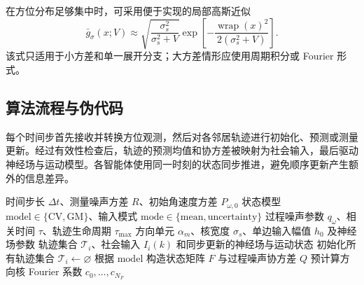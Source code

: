 \documentclass[UTF8,fontset=windows,11pt]{ctexart}
\begin{document}
在方位分布足够集中时，可采用便于实现的局部高斯近似
\begin{equation}
 \bar g_\sigma(x;V)\approx
 \sqrt{\frac{\sigma_s^2}{\sigma_s^2+V}}
 \exp\left[-\frac{\operatorname{wrap}(x)^2}{2(\sigma_s^2+V)}\right].
\end{equation}
该式只适用于小方差和单一展开分支；大方差情形应使用周期积分或 Fourier 形式。

\subsection{算法流程与伪代码}

每个时间步首先接收并转换方位观测，然后对各邻居轨迹进行初始化、预测或测量更新。经过有效性检查后，轨迹的预测均值和协方差被映射为社会输入，最后驱动神经场与运动模型。各智能体使用同一时刻的状态同步推进，避免顺序更新产生额外的信息差异。

\begin{algorithm}[htbp]
 \caption{间歇方位观测下的Kalman预测与神经场输入补偿}
 \label{alg:kalman_compensation}
 \scriptsize
 \begin{algorithmic}[1]
 \Require 时间步长 $\Delta t$、测量噪声方差 $R$、初始角速度方差 $P_{\omega,0}$
 \Require 状态模型 $\mathrm{model}\in\{\mathrm{CV},\mathrm{GM}\}$、输入模式 $\mathrm{mode}\in\{\mathrm{mean},\mathrm{uncertainty}\}$
 \Require 过程噪声参数 $q_\omega$、相关时间 $\tau$、轨迹生命周期 $\tau_{\max}$
 \Require 方向单元 $\alpha_m$、核宽度 $\sigma_s$、单边输入幅值 $h_0$ 及神经场参数
 \Ensure 轨迹集合 $\mathcal T_i$、社会输入 $I_i(k)$ 和同步更新的神经场与运动状态
 \State 初始化所有轨迹集合 $\mathcal T_i\leftarrow\varnothing$
 \State 根据 $\mathrm{model}$ 构造状态矩阵 $F$ 与过程噪声协方差 $Q$
  \State 预计算方向核 Fourier 系数 $c_0,\ldots,c_{N_F}$
 \EndIf
 \end{algorithmic}
\end{algorithm}
\clearpage
\end{document}
